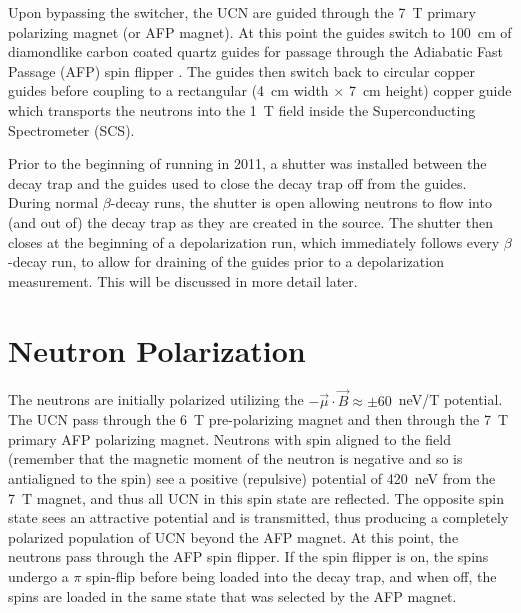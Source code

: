Upon bypassing the switcher,
the UCN are guided through the 7~T primary polarizing magnet (or AFP magnet). At this point
the guides switch to 100~cm of diamondlike carbon coated quartz guides \cite{mammei2010thin}
for passage through the Adiabatic Fast Passage (AFP) spin flipper \cite{holley2012high}.
The guides then switch back to circular copper guides before coupling to a rectangular
(4~cm width $\times$ 7~cm height) copper guide which transports the neutrons into the 1~T field
inside the Superconducting Spectrometer (SCS).

Prior to the beginning of running in 2011, a shutter was installed between the decay trap and
the guides used to close the decay trap off from the guides. During normal $\beta$-decay
runs, the shutter is open allowing neutrons to flow into (and out of) the decay trap as they are
created in the source. The shutter then closes at the beginning of a depolarization run, which immediately
follows every $\beta$-decay run, to allow for draining of the guides prior to a depolarization
measurement. This will be discussed in more detail later.

\section{Neutron Polarization} \label{sec:polarization}

The neutrons are initially polarized utilizing the $-\vec{\mu}\cdot \vec{B} \approx \pm 60$~neV/T
potential. The UCN pass through the 6~T pre-polarizing magnet and then
through the 7~T primary AFP polarizing magnet. Neutrons with spin
aligned to the field (remember that the magnetic moment of the neutron is negative and so is antialigned
to the spin) see a positive (repulsive) potential of 420~neV from the 7~T magnet, and thus all
UCN in this spin state are reflected. The opposite spin state sees an attractive potential
and is transmitted, thus producing
a completely polarized population of UCN beyond the AFP magnet.
At this point, the neutrons pass through the AFP spin flipper. If the spin flipper is on, the spins
undergo a $\pi$ spin-flip before being loaded into the decay trap, and when off, the spins are
loaded in the same state that was selected by the AFP magnet.

